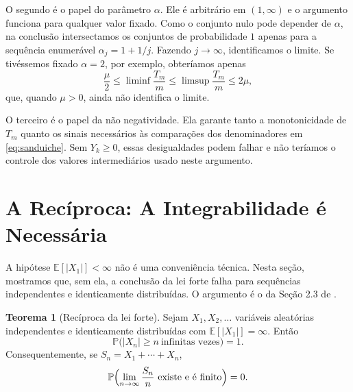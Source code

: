 \documentclass[12pt,portuguese]{article}
\theoremstyle{definition}
\newtheorem{theorem}{Teorema}
\theoremstyle{plainexercise}
\theoremstyle{starredexercise}
\theoremstyle{definition}
\begin{document}
O segundo é o papel do parâmetro $\alpha$. Ele é arbitrário em $(1,\infty)$ e o
argumento funciona para qualquer valor fixado. Como o conjunto nulo pode
depender de $\alpha$, na conclusão intersectamos os conjuntos de probabilidade
$1$ apenas para a sequência enumerável $\alpha_j=1+1/j$. Fazendo $j\to\infty$,
identificamos o limite. Se tivéssemos fixado $\alpha=2$, por exemplo,
obteríamos apenas
\[
\frac{\mu}{2}\leqslant\liminf\frac{T_m}{m}\leqslant\limsup\frac{T_m}{m}\leqslant2\mu,
\]
que, quando $\mu>0$, ainda não identifica o limite.

O terceiro é o papel da não negatividade. Ela garante tanto a monotonicidade
de $T_m$ quanto os sinais necessários às comparações dos denominadores em
\eqref{eq:sanduiche}. Sem $Y_k\geqslant0$, essas desigualdades podem falhar e não teríamos o
controle dos valores intermediários usado neste argumento.

\section{A Recíproca: A Integrabilidade é Necessária}\label{sec:reciproca}

A hipótese $\mathbb{E}[|X_1|]<\infty$ não é uma conveniência técnica. Nesta
seção, mostramos que, sem ela, a conclusão da lei forte falha para sequências
independentes e identicamente distribuídas. O argumento é o da Seção 2.3 de
\cite{MR3930614}.

\begin{theorem}[Recíproca da lei forte]\label{thm:reciproca}
Sejam $X_1,X_2,\ldots$ variáveis aleatórias independentes e identicamente
distribuídas com $\mathbb{E}[|X_1|]=\infty$. Então
\[
\mathbb{P}\bigl(|X_n|\geqslant n\ \text{infinitas vezes}\bigr)=1.
\]
Consequentemente, se $S_n=X_1+\cdots+X_n$,
\[
\mathbb{P}\Bigl(\lim_{n\to\infty}\frac{S_n}{n}\ \text{existe e é finito}\Bigr)=0.
\]
\end{theorem}
\end{document}
